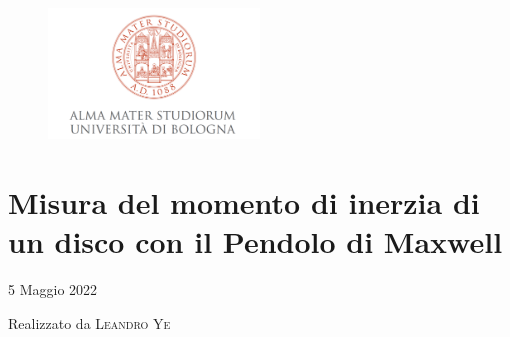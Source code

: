 \thispagestyle{empty} %

\begin{figure}[h]
    \centering
    \includegraphics[width=0.5\textwidth]{image/logo.png}
    \label{Logo}
\end{figure}

\section*{\Huge \bf Misura del momento di inerzia di un disco con il Pendolo di Maxwell}

\vspace{1.0cm}

\begin{center}
    {\large 5 Maggio 2022}
\end{center}

\vspace{0.5cm}


\begin{center}
{\large Realizzato da \textsc{Leandro Ye}}    
\end{center}

\vspace{\fill}

\section*{}

